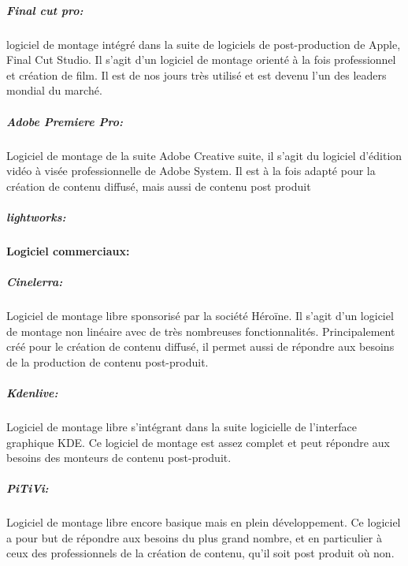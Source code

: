 \subparagraph{Final cut pro:}
logiciel de montage intégré dans la suite de logiciels de post-production
de Apple, Final Cut Studio. Il s'agit d'un logiciel de montage orienté à la fois
professionnel et création de film. Il est de nos jours très utilisé et est devenu l'un
des leaders mondial du marché.

\subparagraph{Adobe Premiere Pro:}
Logiciel de montage de la suite Adobe Creative suite, il s'agit du logiciel
d'édition vidéo à visée professionnelle de Adobe System. Il est à la fois adapté pour la création
de contenu diffusé, mais aussi de contenu post produit

\subparagraph{lightworks:}


\paragraph {Logiciel commerciaux:}

\subparagraph{Cinelerra:}
Logiciel de montage libre sponsorisé par la société Héroïne. Il s'agit d'un logiciel
de montage non linéaire avec de très nombreuses fonctionnalités. Principalement créé pour le création de contenu
diffusé, il permet aussi de répondre aux besoins de la production de contenu post-produit.

\subparagraph{Kdenlive:}
Logiciel de montage libre s'intégrant dans la suite logicielle de l'interface graphique KDE.
Ce logiciel de montage est assez complet et peut répondre aux besoins des monteurs de contenu post-produit.

\subparagraph{PiTiVi:}
Logiciel de montage libre encore basique mais en plein développement.
Ce logiciel a pour but de répondre aux besoins du plus grand nombre,
et en particulier à ceux des professionnels de la création de contenu,
qu'il soit post produit où non.



